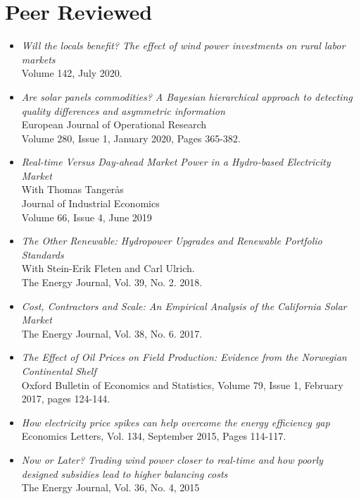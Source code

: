 \documentclass[margin]{res}
\begin{document}
\normalsize{\section{Peer Reviewed}}
\begin{itemize}
\setlength{\itemsep}{10pt}

\item[] \emph{Will the locals benefit? The effect of wind power investments on rural labor markets}\\
Volume 142, July 2020.

\item[] \emph{Are solar panels commodities? A Bayesian hierarchical approach to detecting quality differences and asymmetric information}\\
European Journal of Operational Research\\
Volume 280, Issue 1, January 2020, Pages 365-382.

\item[] \emph{Real-time Versus Day-ahead Market Power in a Hydro-based Electricity Market} \\
With Thomas Tanger\aa s \\
Journal of Industrial Economics\\
Volume 66, Issue 4, June 2019

\item[] \emph{The Other Renewable: Hydropower Upgrades and Renewable Portfolio Standards} \\
With Stein-Erik Fleten and Carl Ulrich.\\
The Energy Journal, Vol. 39, No. 2. 2018.

\item[] \emph{Cost, Contractors and Scale: An Empirical Analysis of the California Solar Market}  \\
The Energy Journal, Vol. 38, No. 6. 2017.

\item[] \emph{The Effect of Oil Prices on Field Production: Evidence from the Norwegian Continental Shelf}\\
Oxford Bulletin of Economics and Statistics, Volume 79, Issue 1, February 2017, pages 124-144.

\item[] \emph{How electricity price spikes can help overcome the energy efficiency gap}\\
Economics Letters, Vol. 134, September 2015, Pages 114-117.

\item[] \emph{Now or Later? Trading wind power closer to real-time and how poorly designed subsidies lead to higher balancing costs}\\
The Energy Journal, Vol. 36, No. 4, 2015


\end{itemize}
\end{document}

